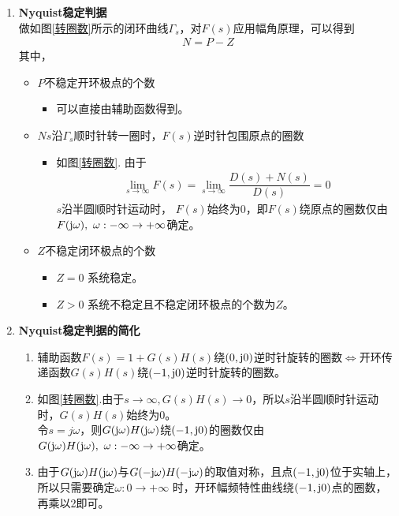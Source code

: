 \begin{enumerate}[1.]
\item \textbf{Nyquist稳定判据}\\
	\hspace*{2em} 做如图\ref{转圈数}所示的闭环曲线$\varGamma_s$，对$F(s)$应用幅角原理，可以得到
	\begin{align}
		N = P - Z
	\end{align}
	其中，
	\begin{itemize}
		\item $P$\quad 不稳定开环极点的个数
		\begin{itemize}
			\item 可以直接由辅助函数得到。
		\end{itemize}
		\item $N$\quad $s$沿$\Gamma_s$顺时针转一圈时，$F(s)$逆时针包围原点的圈数
		\begin{itemize}
			\item 如图\ref{转圈数}. 由于
			\begin{align*}
				\lim\limits_{s \to \infty} F(s) = \lim\limits_{s \to \infty} \dfrac{D(s) + N(s)}{D(s)} = 0
			\end{align*}
			$s$沿半圆顺时针运动时， $F(s)$始终为0，即$F(s)$绕原点的圈数仅由$F(\text{j} \omega), \,\, \omega : -\infty \to +\infty$确定。
			
		\end{itemize}
		\item $Z$\quad 不稳定闭环极点的个数
		\begin{itemize}
			\item $Z=0$ \quad 系统稳定。
			\item $Z>0$ \quad 系统不稳定且不稳定闭环极点的个数为$Z$。
		\end{itemize}
	\end{itemize}
	
\item \textbf{Nyquist稳定判据的简化}
	\begin{enumerate}[(1) ]
		\item 辅助函数$F(s) = 1 + G(s)H(s)$绕$(0,\text{j} 0)$逆时针旋转的圈数$\Longleftrightarrow$开环传递函数$G(s)H(s)$绕$(-1,\text{j} 0)$逆时针旋转的圈数。
		
		\item 如图\ref{转圈数}.由于$s\to \infty, G(s)H(s) \to 0$，所以$s$沿半圆顺时针运动时，$G(s)H(s)$始终为0。\\
		令$s = j \omega $，则$G(\text{j} \omega )H(\text{j} \omega)$绕$(-1,\text{j} 0)$的圈数仅由$G(\text{j} \omega)H(\text{j} \omega), \,\, \omega : -\infty \to +\infty$确定。
		
		\item 由于$G(\text{j} \omega)H(\text{j} \omega)$与$G(- \text{j} \omega) H(- \text{j} \omega)$的取值对称，且点$(-1, \text{j} 0)$位于实轴上，所以只需要确定$\omega : 0 \to +\infty $ 时，开环幅频特性曲线绕$(-1, \text{j} 0)$点的圈数，再乘以2即可。
	\end{enumerate}


\end{enumerate}
